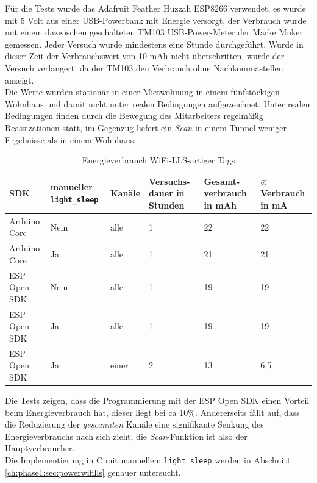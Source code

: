 Für die Tests wurde das Adafruit Feather Huzzah ESP8266 verwendet, es wurde mit 5 Volt aus einer USB-Powerbank mit Energie versorgt, der Verbrauch wurde mit einem dazwischen geschalteten TM103 USB-Power-Meter der Marke Muker gemessen. 
Jeder Versuch wurde mindestens eine Stunde durchgeführt.
Wurde in dieser Zeit der Verbrauchswert von 10 mAh nicht überschritten, wurde der Versuch verlängert, da der TM103 den Verbrauch ohne Nachkommastellen anzeigt.\\
Die Werte wurden stationär in einer Mietwohnung in einem fünfstöckigen Wohnhaus und damit nicht unter realen Bedingungen aufgezeichnet.
Unter realen Bedingungen finden durch die Bewegung des Mitarbeiters regelmäßig Reassizationen statt, im Gegenzug liefert ein \emph{Scan} in einem Tunnel weniger Ergebnisse als in einem Wohnhaus.


\begin{table}[h]
	\centering
	\caption{Energieverbrauch WiFi-LLS-artiger Tags}
	\label{table:llsconsumption}
	\begin{tabular}{p{3cm}|p{2.2cm}|p{1.5cm}|p{2cm}|p{2cm}|p{2cm}}
		SDK & manueller \texttt{light\_sleep} & Kanäle & Versuchs-dauer in Stunden & Gesamt-verbrauch in mAh & $\varnothing$ Verbrauch in mA  \\
		\hline
		Arduino Core & Nein & alle & 1 & 22 & 22 \\
		Arduino Core & Ja & alle & 1 & 21 & 21 \\
		ESP Open SDK & Nein & alle & 1 & 19 & 19 \\
		ESP Open SDK & Ja & alle & 1 & 19 & 19 \\
		\hline
		ESP Open SDK & Ja & einer & 2 & 13 & 6,5 \\
	\end{tabular}
\end{table}

Die Tests zeigen, dass die Programmierung mit der ESP Open SDK einen Vorteil beim Energieverbrauch hat, dieser liegt bei ca 10\%.
Andererseits fällt auf, dass die Reduzierung der \emph{gescannten} Kanäle eine signifikante Senkung des Energieverbrauchs nach sich zieht, die \emph{Scan}-Funktion ist also der Hauptverbraucher.\\
Die Implementierung in C mit manuellem \texttt{light\_sleep} werden in Abschnitt \ref{ch:phase1:sec:powerwifills} genauer untersucht.










